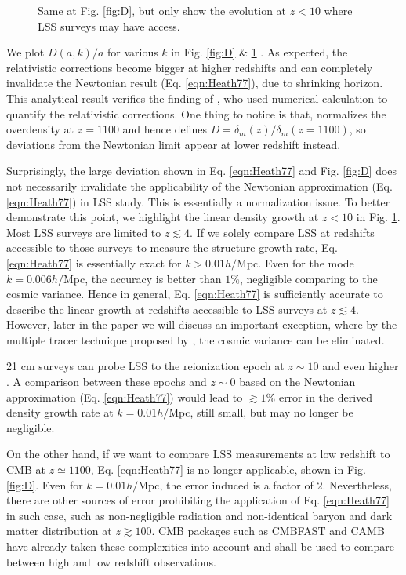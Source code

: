 \documentclass[aps,prl,showpacs,nobibnotes,twocolumn,
nobalancelastpage,superscriptaddress]{revtex4}
\newcommand{\ga}{\gtrsim}
\newcommand{\bfi}{\begin{figure}
\epsfxsize=9cm
\epsffile}
\newcommand{\efi}{\end{figure}}
\newcommand{\la}{\lesssim}
\begin{document}
\bfi{fig3.eps}
\caption{Same at Fig. \ref{fig:D}, but only show the evolution at $z<10$ where
  LSS surveys may have access. \label{fig:D1}}
\efi
We plot $D(a,k)/a$ for various $k$ in Fig. \ref{fig:D} \& \ref{fig:D1} . As expected, the
relativistic corrections become bigger at higher redshifts and can completely
invalidate the Newtonian result (Eq. \ref{eqn:Heath77}), due to shrinking
horizon. This analytical result verifies the finding of \cite{Dent09},  who
used numerical calculation to quantify the relativistic corrections.  One thing to notice is that, \cite{Dent09}  normalizes the
overdensity at $z=1100$ and hence defines $D=\delta_m(z)/\delta_m(z=1100)$, so
deviations from the Newtonian limit appear at lower redshift instead. 

Surprisingly, the large deviation shown in Eq. \ref{eqn:Heath77} and Fig. \ref{fig:D}
does not necessarily invalidate the applicability of the Newtonian approximation
(Eq. \ref{eqn:Heath77}) in LSS study. This is essentially a normalization
issue. To better demonstrate this point, we highlight the linear density
growth at $z<10$ in Fig. \ref{fig:D1}. Most LSS surveys are limited to $z\la
4$.  If we solely compare LSS  
at redshifts accessible to those surveys to measure the structure growth rate,
Eq. \ref{eqn:Heath77} is essentially exact for $k>0.01h/$Mpc. Even for the mode $k=0.006h/$Mpc, the accuracy is better than $1\%$, negligible
comparing to  the cosmic variance.  Hence in general, Eq. \ref{eqn:Heath77}
is sufficiently 
accurate to describe the linear growth at redshifts accessible to LSS
surveys at $z\la 4$. However, later in the paper we will discuss an important
exception, where by the multiple tracer technique proposed by \cite{Seljak09},
the cosmic variance can be eliminated. 


21 cm surveys can probe LSS to the reionization epoch at  $z\sim 10$ and even
higher \cite{21cm}. A comparison between these epochs and $z\sim 0$ based on
the Newtonian approximation (Eq. \ref{eqn:Heath77}) would lead to $\ga 1\%$ error
in the derived density growth rate at $k=0.01 h/$Mpc, still small, but may no
longer be negligible. 

On the other hand, if we want to compare LSS measurements at low redshift to
CMB at 
$z\simeq 1100$, Eq. \ref{eqn:Heath77} is no longer applicable, shown in Fig. \ref{fig:D}. Even for
$k=0.01h/$Mpc, the error induced is a factor of $2$.  Nevertheless, there are
other sources of error prohibiting the application of Eq. \ref{eqn:Heath77} in
such case, such as non-negligible radiation and non-identical baryon and dark
matter distribution at $z\ga 100$. CMB packages such as CMBFAST and CAMB have already taken these
complexities into account and shall be used to compare between high and low
redshift observations. 
\end{document}
